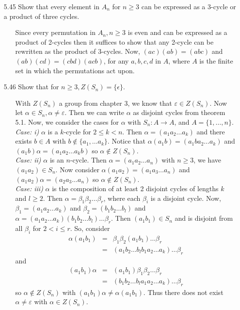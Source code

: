\documentclass[12pt]{article}
\begin{document}
\begin{enumerate}
\item[5.45] Show that every element in $A_n$ for $n \geq 3$ can be expressed as a 3-cycle
or a product of three cycles.
\begin{enumerate}
\item[] Since every permutation in $A_n, n \geq 3$ is even and can be expressed as a product of 2-cycles
then it suffices to show that any 2-cycle can be rewritten as the product of 3-cycles.
Now, $(ac)(ab) = (abc)$ and $(ab)(cd) = (cbd)(acb)$, for any $a, b, c, d$ in $A$, where
$A$ is the finite set in which the permutations act upon.
\end{enumerate}

\item[5.46] Show that for $n \geq 3, Z(S_n) = \{ \epsilon \}$.
\begin{enumerate}
\item[] With $Z(S_n)$ a group from chapter 3, we know that $\varepsilon \in Z(S_n)$. Now let 
$\alpha \in S_n, \alpha \neq \varepsilon$. Then we can write $\alpha$ as disjoint cycles from 
theorem 5.1. Now, we consider the cases for $\alpha$ with $S_n : A \rightarrow A$, and 
$A = \{ 1, \ldots, n \}$. \\
\emph{Case: i)} $\alpha$ is a $k$-cycle for $2 \leq k < n$. Then $\alpha = 
(a_1a_2\ldots a_k)$ and there exists $b \in A$ with $b \not\in \{ a_1, \ldots a_k \}$.
Notice that $\alpha(a_1b) = (a_1ba_2 \ldots a_k)$ and $(a_1b)\alpha = (a_1a_2\ldots a_kb)$
so $\alpha \not\in Z(S_n)$. \\
\emph{Case: ii)} $\alpha$ is an $n$-cycle. Then $\alpha = (a_1a_2\ldots a_n)$ with $n \geq 3$, 
we have $(a_1a_2) \in S_n$. Now consider $\alpha (a_1a_2) = (a_1a_3\ldots a_n)$ and
$(a_1a_2)\alpha = (a_2a_3\ldots a_n)$ so $\alpha \not\in Z(S_n)$. \\
\emph{Case: iii)} $\alpha$ is the composition of at least 2 disjoint cycles of lengths $k$
and $l \geq 2$. Then $\alpha = \beta_1 \beta_2 \ldots \beta_r$, where each $\beta_i$ is a
disjoint cycle. Now, $\beta_1 = (a_1a_2\ldots a_k)$ and $\beta_2 = (b_1b_2\ldots b_l)$ and
$\alpha = (a_1a_2\ldots a_k)(b_1b_2\ldots b_l)\ldots \beta_r$. Then $(a_1b_1) \in S_n$ and
is disjoint from all $\beta_i$ for $2 < i \leq r$. So, consider
\begin{eqnarray*}
\alpha (a_1b_1) &=& \beta_1\beta_2(a_1b_1)\ldots \beta_r \\
&=& (a_1b_2\ldots b_lb_1a_2\ldots a_k)\ldots \beta_r
\end{eqnarray*}
and
\begin{eqnarray*}
(a_1b_1)\alpha &=& (a_1b_1)\beta_1\beta_2\ldots \beta_r \\
&=& (b_1b_2\ldots b_la_1a_2\ldots a_k)\ldots \beta_r
\end{eqnarray*}
so $\alpha \not\in Z(S_n)$ with $(a_1b_1)\alpha \neq \alpha (a_1b_1)$. Thus there does
not exist $\alpha \neq \varepsilon$ with $\alpha \in Z(S_n)$.
\end{enumerate}


\end{enumerate}
\end{document}
